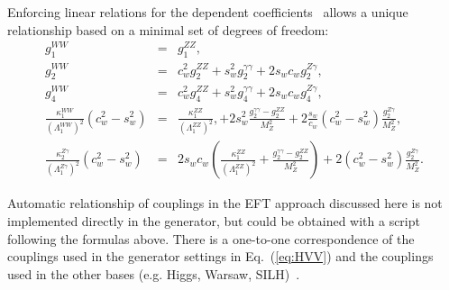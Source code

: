 \documentclass[aps,superscriptaddress,nofootinbib]{revtex4}
\begin{document}
Enforcing linear relations for the dependent coefficients~\cite{deFlorian:2016spz} allows a unique relationship based on a minimal set of degrees of freedom:
\begin{eqnarray}
  g_1^{WW} &=& g_1^{ZZ} 
  ,    
  \label{eq:deltaMW}
  \\
  g_2^{WW} &=& c_w^2 g_2^{ZZ} + s_w^2 g_2^{\gamma\gamma} + 2 s_w c_w g_2^{Z\gamma},
  \label{eq:g2WW}
  \\
  g_4^{WW} &=& c_w^2 g_4^{ZZ} + s_w^2 g_4^{\gamma\gamma} + 2 s_w c_w g_4^{Z\gamma},
  \label{eq:g4WW}
  \\
  \frac{\kappa_1^{WW}}{(\Lambda_1^{WW})^2} (c_w^2-s_w^2) &=& \frac{\kappa_1^{ZZ}}{(\Lambda_1^{ZZ})^2},
                                                           +2 s_w^2 \frac{g_2^{\gamma\gamma}-g_2^{ZZ}}{M_Z^2} 
                                                          +2 \frac{s_w}{c_w} (c_w^2-s_w^2) \frac{g_2^{Z\gamma}}{M_Z^2},
 \label{eq:kappa1WW}
  \\
  \frac{\kappa_2^{Z\gamma}}{(\Lambda_1^{Z\gamma})^2} (c_w^2-s_w^2) &=&  2 s_w c_w \left( \frac{\kappa_1^{ZZ}}{(\Lambda_1^{ZZ})^2} 
                                                                              + \frac{ g_2^{\gamma\gamma} - g_2^{ZZ}}{M_Z^2}  \right)
                                                                               +2 (c_w^2-s_w^2) \frac{g_2^{Z\gamma}}{M_Z^2}.
 \label{eq:kappa2Zgamma}
 \end{eqnarray}

Automatic relationship of couplings in the EFT approach discussed here is not implemented directly in the generator, 
but could be obtained with a script following the formulas above. 
There is a one-to-one correspondence of the couplings used in the generator settings in Eq.~(\ref{eq:HVV}) 
and the couplings used in the other bases (e.g. Higgs, Warsaw, SILH)~\cite{deFlorian:2016spz}. 
\\
\end{document}
